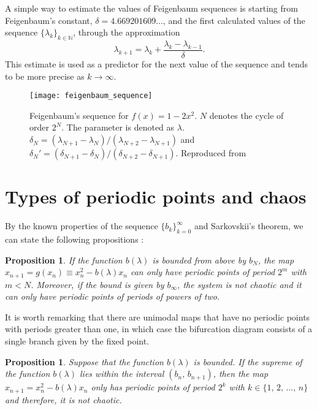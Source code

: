 \documentclass[10pt,twoside,titlepage]{book}
\numberwithin{equation}{chapter}
\numberwithin{figure}{chapter}
\numberwithin{table}{chapter}
\theoremstyle{plain}%
\newtheorem{prop}[thm]{Proposition}
\theoremstyle{definition}
\theoremstyle{remark}
\begin{document}
A simple way to estimate the values of Feigenbaum sequences is starting from Feigenbaum's constant, $\delta=4.669201609...$, and the first calculated values of the sequence $\{\lambda_{k}\}_{k\in\mathbb{N}}$, through the approximation
\begin{equation}
	\lambda_{k+1}=\lambda_{k}+\frac{\lambda_{k}-\lambda_{k-1}}{\delta}.
	\label{eq:Bapprox}
\end{equation}
This estimate is used as a predictor for the next value of the sequence and tends to be more precise as $k\rightarrow\infty$.

\begin{figure}
	\centering
	\texttt{[image: feigenbaum\_sequence]}
	\caption{Feigenbaum's sequence for $f(x)=1-2x^{2}$. $N$ denotes the cycle of order $2^{N}$. The parameter is denoted as $\lambda$. $\delta_{N}=(\lambda_{N+1}-\lambda_{N})/(\lambda_{N+2}-\lambda_{N+1})$
		and $\delta_{N}'=(\delta_{N+1}-\delta_{N})/(\delta_{N+2}-\delta_{N+1})$. Reproduced from \cite{Feigenbaum}}
	\label{tab:feigenbaum}
\end{figure}

\section{Types of periodic points and chaos}
\label{sec:types-perpt-chaos}

By the known properties of the sequence $\{b_{k}\}_{k=0}^{\infty}$ and Sarkovskii's theorem, we can state the following propositions \cite{Solis2004}:

\begin{prop}
	\label{prop:bk-perpt}
	If the function $b(\lambda)$ is bounded from above by $b_{N}$, the map $x_{n+1}=g(x_{n})\equiv x_{n}^{2}-b(\lambda)x_{n}$ can only have periodic points of period $2^{m}$ with $m<N$. Moreover, if the bound is given by $b_{\infty}$, the system is not chaotic and it can only have periodic points of periods of powers of two.
\end{prop}

It is worth remarking that there are unimodal maps that have no periodic points with periods greater than one, in which case the bifurcation diagram consists of a single branch given by the fixed point.

\begin{prop}
	\label{prop:not-chaotic}
	Suppose that the function $b(\lambda)$ is bounded. If the supreme of the function $b(\lambda)$ lies within the interval $(b_{n},\, b_{n+1})$, then the map $x_{n+1}=x_{n}^{2}-b(\lambda)x_{n}$ only has periodic points of period $2^{k}$ with $k\in\{1,\,2,\,...,\, n\}$ and therefore, it is \emph{not} chaotic.
\end{prop}
\end{document}
